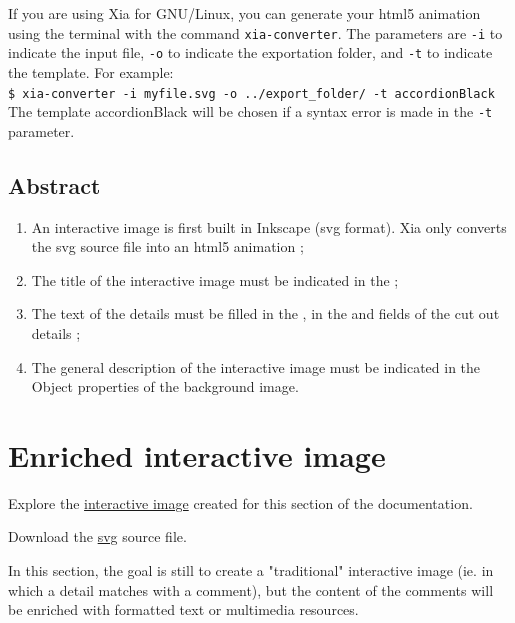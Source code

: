 \begin{tip}
 If you are using Xia for GNU/Linux, you can generate your html5 animation
 using the terminal with the command \texttt{xia-converter}. The parameters are
 \texttt{-i} to indicate the input file, \texttt{-o} to indicate the exportation folder, and
 \texttt{-t} to indicate the template. For example:\\
 \texttt{\$ xia-converter -i myfile.svg -o ../export\_folder/ -t accordionBlack}\\
 The template accordionBlack will be chosen if a syntax error is made in the \texttt{-t} parameter.
\end{tip}


\subsection{Abstract}

\begin{enumerate}
 \item An interactive image is first built in Inkscape (svg format). Xia only 
 converts the svg source file into an html5 animation ;
 \item The title of the interactive image must be indicated in the  ;
 \item The text of the details must be filled in the , 
 in the  and  fields of the cut out details ;
 \item The general description of the interactive image must be indicated in the \softmenu
{Object properties} of the background image.
\end{enumerate}

\section{Enriched interactive image}\label{enriched_IA}

\begin{links}
Explore the \href{http://xia.dane.ac-versailles.fr/demo/tuto/xia2}{interactive image} created for this section of the documentation.

Download the \href{http://xia.dane.ac-versailles.fr/demo/tuto/xia2/svg/xia2.svg}{svg} source file.
\end{links}

In this section, the goal is still to create a "traditional" interactive image 
(ie. in which a detail matches with a comment), but the content of the comments 
will be enriched with  formatted text or multimedia resources.


